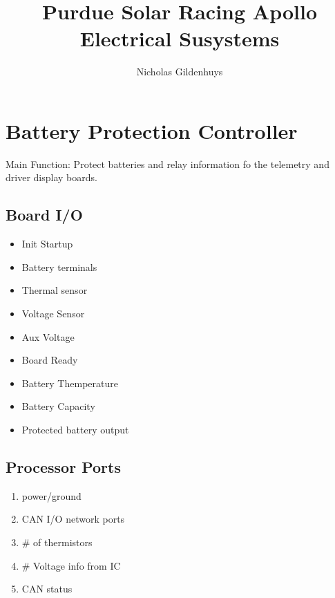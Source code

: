 \documentclass[letterpaper,12pt]{article}
\title{Purdue Solar Racing Apollo Electrical Susystems}
\author{Nicholas Gildenhuys}
\begin{document}
\maketitle
\tableofcontents
\newpage

\section{Battery Protection Controller}
   Main Function: Protect batteries and relay information fo the telemetry and driver display boards.  
   \subsection{Board I/O}
   \begin{multicols}{2}
   
   \begin{itemize}
      \item Init Startup
   \end{itemize}
      
   \begin{itemize}
      \item Battery terminals
      \item Thermal sensor
      \item Voltage Sensor
      \item Aux Voltage
   \end{itemize}
   
   \columnbreak
   

   \begin{itemize}
      \item Board Ready
      \item Battery Themperature
      \item Battery Capacity
   \end{itemize}
   
   \begin{itemize}
      \item Protected battery output
   \end{itemize}
   \end{multicols}
   \subsection{Processor Ports}
   \begin{multicols}{2}
   \begin{enumerate}[(a.)]
      \item power/ground
      \item CAN I/O network ports
      \item \# of thermistors
      \item \# Voltage info from IC
      
      \item CAN status
   \end{enumerate}
   \end{multicols}
\end{document}
